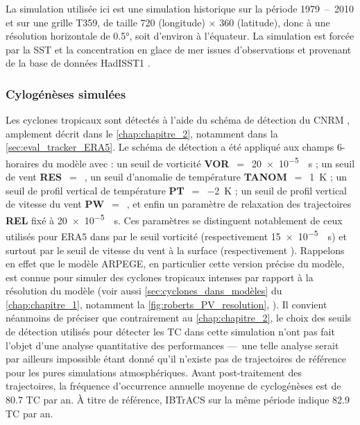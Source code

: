 \documentclass[../main.tex]{subfiles}
\begin{document}
La simulation utilisée ici est une simulation historique sur la période \num{1979}~--~\num{2010} et sur une grille T359, de taille \num{720} (longitude)
$\times$ \num{360} (latitude), donc à une résolution horizontale de \ang{0.5}, soit d'environ  à l'équateur. La simulation est forcée par la SST et la concentration
en glace de mer issues d'observations et provenant de la base de données HadISST1 \parencite{rayner_global_2003}.

\subsubsection{Cylogénèses simulées}\label{sec:tracking_arpege}

Les cyclones tropicaux sont détectés à l'aide du schéma de détection du CNRM \parencite{chauvin_response_2006}, amplement décrit dans le \cref{chap:chapitre_2},
notamment dans la \cref{sec:eval_tracker_ERA5}. Le schéma de détection a été appliqué aux champs 6-horaires du modèle avec : un seuil de vorticité
\textbf{VOR}~$=$~\SI{20e-5}{\per\second} ; un seuil de vent \textbf{RES}~$=$~, un seuil d'anomalie de température \textbf{TANOM}~$=$~\SI{1}{\kelvin} ; un
seuil de profil vertical de température \textbf{PT}~$=$~\SI{-2}{\kelvin} ; un seuil de profil vertical de vitesse du vent \textbf{PW}~$=$~, et enfin un
paramètre de relaxation des trajectoires \textbf{REL} fixé à \SI{20e-5}{\per\second}. Ces paramètres se distinguent notablement de ceux utilisés pour ERA5 dans
\textcite{dulac_assessing_2023} par le seuil vorticité (respectivement \SI{15e-5}{\per\second}) et surtout par le seuil de vitesse du vent à la surface
(respectivement ). Rappelons en effet que le modèle ARPEGE, en particulier cette version précise du modèle, est connue pour simuler des cyclones tropicaux
intenses par rapport à la résolution du modèle \parencite{roberts_impact_2020,chauvin_future_2020} (voir aussi \cref{sec:cyclones_dans_modèles} du
\cref{chap:chapitre_1}, notamment la \cref{fig:roberts_PV_resolution}, ). Il convient néanmoins de préciser que
contrairement au \cref{chap:chapitre_2}, le choix des seuils de détection utilisés pour détecter les TC dans cette simulation n'ont pas fait l'objet d'une
analyse quantitative des performances ---~une telle analyse serait par ailleurs impossible étant donné qu'il n'existe pas de trajectoires de référence pour les
pures simulations atmosphériques. Avant post-traitement des trajectoires, la fréquence d'occurrence annuelle moyenne de cyclogénèses est de \num{80.7} TC par
an. À titre de référence, IBTrACS sur la même période indique \num{82.9} TC par an.
\end{document}
